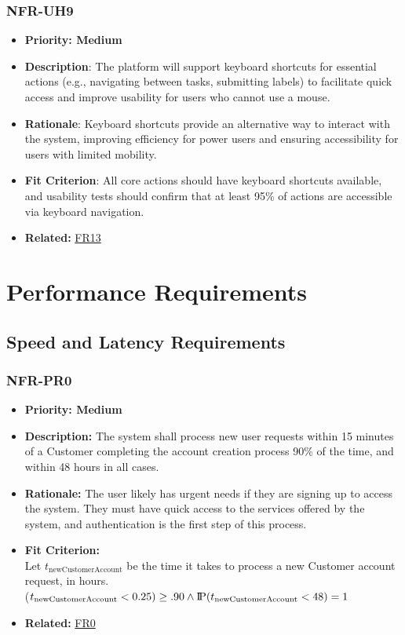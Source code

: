 \documentclass[12pt]{article}
\newcommand{\probP}{\text{I\kern-0.15em P}}
\begin{document}
        \subsubsection*{NFR-UH9} 
        \label{sec:UH9}
        \begin{itemize} 
          \item \textbf{Priority: Medium}
            \item \textbf{Description}: The platform will support keyboard shortcuts for essential actions (e.g., navigating between tasks, submitting labels) to facilitate quick access and improve usability for users who cannot use a mouse.  
            \item \textbf{Rationale}: Keyboard shortcuts provide an alternative way to interact with the system, improving efficiency for power users and ensuring accessibility for users with limited mobility.  
            \item \textbf{Fit Criterion}: All core actions should have keyboard shortcuts available, and usability tests should confirm that at least 95\% of actions are accessible via keyboard navigation.
            \item \textbf{Related:} \hyperref[sec:FR13]{FR13}
        \end{itemize}



\section{Performance Requirements}
\subsection{Speed and Latency Requirements}
\subsubsection*{NFR-PR0}
\label{sec:PR0}
\begin{itemize}
  \item \textbf{Priority: Medium}
  \item \textbf{Description:} The system shall process new user requests within 15 minutes of a Customer completing the account creation process 90\% of the time, and within 48 hours in all cases. 
  \item \textbf{Rationale:} The user likely has urgent needs if they are signing up to access the system. They must have quick access to the services offered by the system, and authentication is the first step of this process.
  \item \textbf{Fit Criterion:}\\ Let $t_{\text{newCustomerAccount}}$ be the time it takes to process a new Customer account request, in hours.\\ \probP($t_{\text{newCustomerAccount}} < 0.25) \geq .90 \wedge \probP(t_{\text{newCustomerAccount}} < 48) = 1 $
  \item \textbf{Related:} \hyperref[sec:FR0]{FR0}
\end{itemize}
\end{document}

